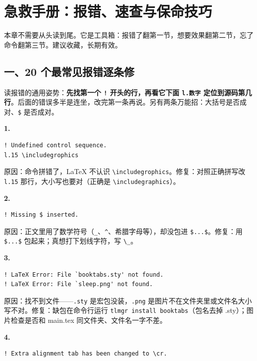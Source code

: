 \chapter{急救手册：报错、速查与保命技巧}

\begin{notebox}
本章不需要从头读到尾。它是工具箱：报错了翻第一节，想要效果翻第二节，忘了命令翻第三节。建议收藏，长期有效。
\end{notebox}

\section*{一、20 个最常见报错逐条修}

读报错的通用姿势：\textbf{先找第一个 \texttt{!} 开头的行，再看它下面 \texttt{l.数字} 定位到源码第几行}。后面的错误多半是连坐，改完第一条再说。另有两条万能招：大括号是否成对、\texttt{\$} 是否成对。

\textbf{1.}

\begin{lstlisting}
! Undefined control sequence.
l.15 \includegrophics
\end{lstlisting}

原因：命令拼错了，LaTeX 不认识 \texttt{\textbackslash{}includegrophics}。修复：对照正确拼写改 \texttt{l.15} 那行，大小写也要对（正确是 \texttt{\textbackslash{}includegraphics}）。

\textbf{2.}

\begin{lstlisting}
! Missing $ inserted.
\end{lstlisting}

原因：正文里用了数学符号（\texttt{\_}、\texttt{\textasciicircum{}}、希腊字母等），却没包进 \texttt{\$...\$}。修复：用 \texttt{\$...\$} 包起来；真想打下划线字符，写 \texttt{\textbackslash{}\_}。

\textbf{3.}

\begin{lstlisting}
! LaTeX Error: File `booktabs.sty' not found.
! LaTeX Error: File `sleep.png' not found.
\end{lstlisting}

原因：找不到文件——\texttt{.sty} 是宏包没装，\texttt{.png} 是图片不在文件夹里或文件名大小写不对。修复：缺包在命令行运行 \texttt{tlmgr install booktabs}（包名去掉 .sty）；图片检查是否和 main.tex 同文件夹、文件名一字不差。

\textbf{4.}

\begin{lstlisting}
! Extra alignment tab has been changed to \cr.
\end{lstlisting}

